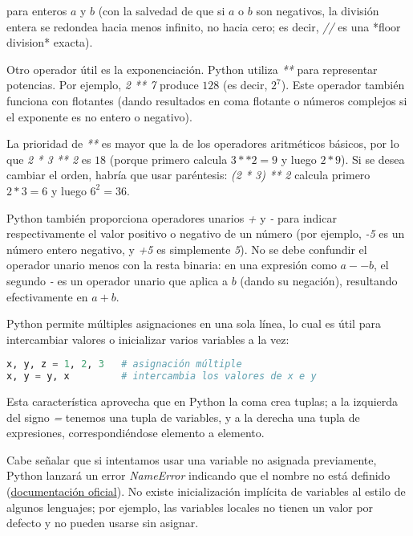 para enteros $a$ y $b$ (con la salvedad de que si $a$ o $b$ son negativos, la división entera se redondea hacia menos infinito, 
no hacia cero; es decir, \textit{//} es una *floor division* exacta).

Otro operador útil es la exponenciación. Python utiliza \textit{**} para representar potencias. 
Por ejemplo, \textit{2 ** 7} produce $128$ (es decir, $2^7$). 
Este operador también funciona con flotantes (dando resultados en coma flotante o números complejos si el exponente es no entero o negativo). 

La prioridad de \textit{**} es mayor que la de los operadores aritméticos básicos, 
por lo que \textit{2 * 3 ** 2} es $18$ (porque primero calcula $3 ** 2 = 9$ y luego $2 * 9$). 
Si se desea cambiar el orden, habría que usar paréntesis: \textit{(2 * 3) ** 2} calcula primero $2 * 3 = 6$ y luego $6^{2} = 36$.

Python también proporciona operadores unarios \textit{+} y \textit{-} para indicar respectivamente el valor positivo o negativo de un número 
(por ejemplo, \textit{-5} es un número entero negativo, y \textit{+5} es simplemente \textit{5}). 
No se debe confundir el operador unario menos con la resta binaria: en una expresión como $a - -b$, 
el segundo \textit{-} es un operador unario que aplica a $b$ (dando su negación), resultando efectivamente en $a + b$.

Python permite múltiples asignaciones en una sola línea, lo cual es útil para intercambiar valores o inicializar varios variables a la vez:

\begin{lstlisting}[language=Python, caption={Asignación múltiple en Python.}]
x, y, z = 1, 2, 3   # asignación múltiple
x, y = y, x         # intercambia los valores de x e y
\end{lstlisting}

Esta característica aprovecha que en Python la coma crea tuplas; 
a la izquierda del signo \textit{=} tenemos una tupla de variables, 
y a la derecha una tupla de expresiones, correspondiéndose elemento a elemento.

Cabe señalar que si intentamos usar una variable no asignada previamente, 
Python lanzará un error \textit{NameError} indicando que el nombre no está definido 
(\href{https://docs.python.org/3/reference/executionmodel.html}{documentación oficial}). 
No existe inicialización implícita de variables al estilo de algunos lenguajes; 
por ejemplo, las variables locales no tienen un valor por defecto y no pueden usarse sin asignar.

